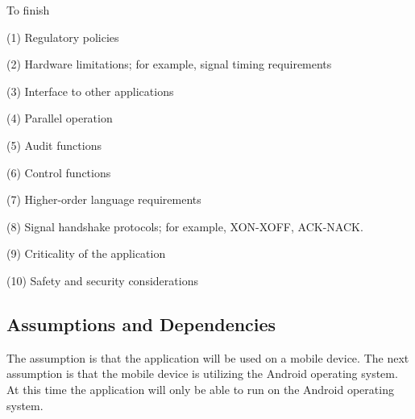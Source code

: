   To finish

  (1)  Regulatory policies

  (2)  Hardware limitations; for example, signal timing requirements

  (3)  Interface to other applications

  (4)  Parallel operation

  (5)  Audit functions

  (6)  Control functions

  (7)  Higher-order language requirements

  (8)  Signal handshake protocols; for example, XON-XOFF, ACK-NACK.

  (9)  Criticality of the application

  (10) Safety and security considerations
  \subsection{Assumptions and Dependencies}

  The assumption is that the application will be used on a mobile device. The next assumption is that the mobile device is utilizing the Android operating system. At this time the application will only be able to run on the Android operating system.
